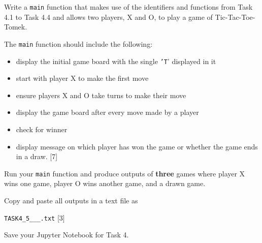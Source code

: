 Write a \texttt{main} function that makes use of the identifiers and
functions from Task 4.1 to Task 4.4 and allows two players, X and
O, to play a game of Tic-Tac-Toe-Tomek. 

The \texttt{main} function should include the following: 
\begin{itemize}
\item display the initial game board with the single \texttt{'T}' displayed
in it 
\item start with player X to make the first move 
\item ensure players X and O take turns to make their move 
\item display the game board after every move made by a player 
\item check for winner 
\item display message on which player has won the game or whether the game
ends in a draw. \hfill{} {[}7{]}
\end{itemize}
Run your \texttt{main} function and produce outputs of \textbf{three}
games where player X wins one game, player O wins another game, and
a drawn game. 

Copy and paste all outputs in a text file as 

\texttt{TASK4\_5\_<your name>\_<centre number>\_<index number>.txt}
\hfill{} {[}3{]}

Save your Jupyter Notebook for Task 4.